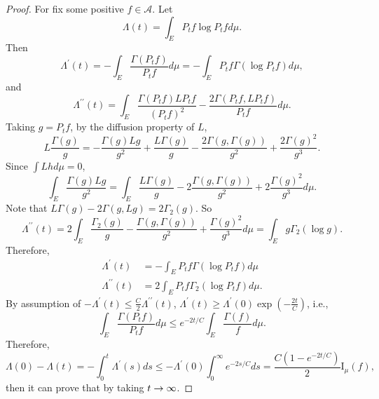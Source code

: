 \begin{proof}
    For fix some positive $f \in \mathcal{A}$. Let
    \begin{equation*}
        \Lambda(t)=\int_E P_t f \log P_t f d \mu.
    \end{equation*}
    Then
    \begin{equation*}
        \Lambda^{\prime}(t)=-\int_E \frac{\Gamma\left(P_t f\right)}{P_t f} d \mu=-\int_E P_t f \Gamma\left(\log P_t f\right) d \mu,
    \end{equation*}
    and
    \begin{equation*}
        \Lambda^{\prime \prime}(t)=\int_E \frac{\Gamma\left(P_t f\right) L P_t f}{\left(P_t f\right)^2}-\frac{2 \Gamma\left(P_t f, L P_t f\right)}{P_t f} d \mu.
    \end{equation*}
    Taking $g = P_t f$, by the diffusion property of $L$,
    \begin{equation*}
        L \frac{\Gamma(g)}{g}=-\frac{\Gamma(g) L g}{g^2}+\frac{L \Gamma(g)}{g}-\frac{2 \Gamma(g, \Gamma(g))}{g^2}+\frac{2 \Gamma(g)^2}{g^3} .
    \end{equation*}
    Since $\int Lh d\mu = 0$,
    \begin{equation*}
        \int_E \frac{\Gamma(g) L g}{g^2}=\int_E \frac{L \Gamma(g)}{g}-2 \frac{\Gamma(g, \Gamma(g))}{g^2}+2 \frac{\Gamma(g)^2}{g^3} d \mu .
    \end{equation*}
    Note that $L \Gamma(g)-2 \Gamma(g, L g)=2 \Gamma_2(g)$. So
    \begin{equation*}
        \Lambda^{\prime \prime}(t)=2 \int_E \frac{\Gamma_2(g)}{g}-\frac{\Gamma(g, \Gamma(g))}{g^2}+\frac{\Gamma(g)^2}{g^3} d \mu = \int_E g \Gamma_2(\log g).
    \end{equation*}
    Therefore,
    \begin{align*}
        \Lambda^{\prime}(t) & =-\int_E P_t f \Gamma\left(\log P_t f\right) d \mu \\
        \Lambda^{\prime \prime}(t) & =2 \int_E P_t f \Gamma_2\left(\log P_t f\right) d \mu.
    \end{align*}
    By assumption of $-\Lambda^{\prime}(t) \leq \frac{C}{2} \Lambda^{\prime \prime}(t)$, $\Lambda^\prime(t) \geq \Lambda^\prime(0) \exp(-\frac{2t}{C})$, i.e.,
    \begin{equation*}
        \int_E \frac{\Gamma\left(P_t f\right)}{P_t f} d \mu \leq e^{-2 t / C} \int_E \frac{\Gamma(f)}{f} d \mu.
    \end{equation*}
    Therefore,
    \begin{equation*}
        \Lambda(0)-\Lambda(t)=-\int_0^t \Lambda^{\prime}(s) d s \leq-\Lambda^{\prime}(0) \int_0^{\infty} e^{-2 s / C} d s=\frac{C\left(1-e^{-2 t / C}\right)}{2} \mathrm{I}_\mu(f),
    \end{equation*}
    then it can prove that by taking $t \rightarrow \infty$.
\end{proof}
